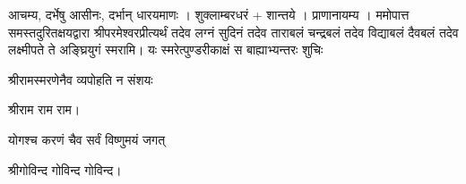 


आचम्य, दर्भेषु आसीनः, दर्भान् धारयमाणः । शुक्लाम्बरधरं + शान्तये । प्राणानायम्य । 
    ममोपात्त समस्तदुरितक्षयद्वारा श्रीपरमेश्वरप्रीत्यर्थं   तदेव लग्नं सुदिनं तदेव ताराबलं चन्द्रबलं तदेव विद्याबलं दैवबलं तदेव लक्ष्मीपते ते अङ्घ्रियुगं स्मरामि।
    {यः स्मरेत्पुण्डरीकाक्षं स बाह्याभ्यन्तरः शुचिः}

{श्रीरामस्मरणेनैव व्यपोहति न संशयः }

श्रीराम राम राम। 

{योगश्च करणं चैव सर्वं विष्णुमयं जगत्}

श्रीगोविन्द गोविन्द गोविन्द। 

